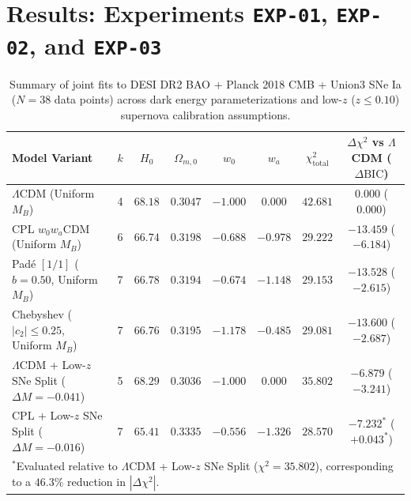 \documentclass[11pt,a4paper]{article}
\begin{document}
\section{Results: Experiments \texttt{EXP-01}, \texttt{EXP-02}, and \texttt{EXP-03}}

\begin{table}[t!]
\centering
\caption{Summary of joint fits to DESI DR2 BAO + Planck 2018 CMB + Union3 SNe Ia ($N = 38$ data points) across dark energy parameterizations and low-$z$ ($z \le 0.10$) supernova calibration assumptions.}
\label{tab:exp02}
\vspace{0.4em}
\small
\begin{tabular}{lccccccc}
\toprule
Model Variant & $k$ & $H_0$ & $\Omega_{m,0}$ & $w_0$ & $w_a$ & $\chi^2_{\mathrm{total}}$ & $\Delta\chi^2$ vs $\Lambda$CDM ($\Delta\mathrm{BIC}$) \\
\midrule
$\Lambda$CDM (Uniform $M_B$) & 4 & $68.18$ & $0.3047$ & $-1.000$ & $0.000$ & $42.681$ & $0.000$ ($0.000$) \\
CPL $w_0w_a$CDM (Uniform $M_B$) & 6 & $66.74$ & $0.3198$ & $-0.688$ & $-0.978$ & $29.222$ & $-13.459$ ($-6.184$) \\
Pad\'e $[1/1]$ ($b = 0.50$, Uniform $M_B$) & 7 & $66.78$ & $0.3194$ & $-0.674$ & $-1.148$ & $29.153$ & $-13.528$ ($-2.615$) \\
Chebyshev ($|c_2| \le 0.25$, Uniform $M_B$) & 7 & $66.76$ & $0.3195$ & $-1.178$ & $-0.485$ & $29.081$ & $-13.600$ ($-2.687$) \\
$\Lambda$CDM + Low-$z$ SNe Split ($\Delta M = -0.041$) & 5 & $68.29$ & $0.3036$ & $-1.000$ & $0.000$ & $35.802$ & $-6.879$ ($-3.241$) \\
CPL + Low-$z$ SNe Split ($\Delta M = -0.016$) & 7 & $65.41$ & $0.3335$ & $-0.556$ & $-1.326$ & $28.570$ & $\mathbf{-7.232}^*$ ($+0.043^*$) \\
\bottomrule
\multicolumn{8}{l}{\footnotesize $^*$Evaluated relative to $\Lambda$CDM + Low-$z$ SNe Split ($\chi^2 = 35.802$), corresponding to a $46.3\%$ reduction in $|\Delta\chi^2|$.}
\end{tabular}
\end{table}
\end{document}
